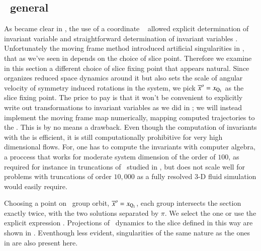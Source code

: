 
\subsection{\label{s:mfReqb}\CLe\  general \slice}

As became clear in , the use of a coordinate \slice\ 
allowed explicit determination of invariant variable  and straightforward
determination of invariant variables . Unfortunately the moving frame
method introduced artificial singularities in \reducedsp, that as we've seen in 
depends on the choice of slice point.
Therefore we examine in this section a different choice of slice fixing point that appears natural.
Since  organizes reduced space dynamics around it but also sets the
scale of angular velocity of symmetry induced rotations in the system, we 
pick ${\overline{x}^o}=x_{\mathrm{Q}_{1}}$ as the slice fixing point.
The price to pay is that it won't be convenient to explicitly write out 
transformations to invariant variables
as we did in ; we will instead implement the moving frame map numerically,
mapping computed trajectories to the \slice.
This is by no means a drawback. Even though the computation of invariants with the
{\mframes} is efficient, it is still computationally
prohibitive for very high dimensional flows. For, one has
to compute the invariants with computer algebra, a proccess
that works for moderate system dimension of the order of $100$,
as required for instance in truncations of \KSe\ studied in ,
but does not scale well for problems with truncations of order $10,000$ as
a fully resolved $3$-D fluid simulation would easily require.


Choosing a point on \reqv\ group orbit,
${\overline{x}^o}  = x_{\mathrm{Q}_{1}}$,
each group intersects the section exactly twice,  with the
two solutions separated by $\pi$. We select the one 
 or use
the explicit expression .
Projections of \cLe\ dynamics to the slice defined in this way are
shown in \reffig{fig:CLEmfReqb1}. Eventhough less evident, singularities
of the same nature as the ones in \refsect{s:cLeCoordMF} are also present
here. 



